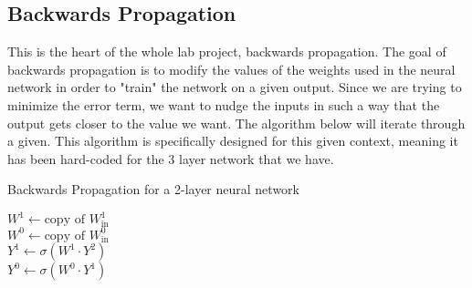 \documentclass[10pt]{article}
\begin{document}
\subsection{Backwards Propagation}
This is the heart of the whole lab project, backwards propagation. The goal of backwards propagation is to modify the values of the weights used in the neural network in order to "train" the network on a given output. Since we are trying to minimize the error term, we want to nudge the inputs in such a way that the output gets closer to the value we want. The algorithm below will iterate through a given. This algorithm is specifically designed for this given context, meaning it has been hard-coded for the 3 layer network that we have.\newline
\begin{algorithm}[H]
    \caption{Backwards Propagation for a 2-layer neural network}
    $W^1 \gets \text{copy of } W^1_\text{in}$\\
    $W^0 \gets \text{copy of } W^0_\text{in}$\\
    $Y^1 \gets \sigma(W^1 \cdot Y^2)$\\
    $Y^0 \gets \sigma(W^0 \cdot Y^1)$\\
\end{algorithm}
\end{document}
